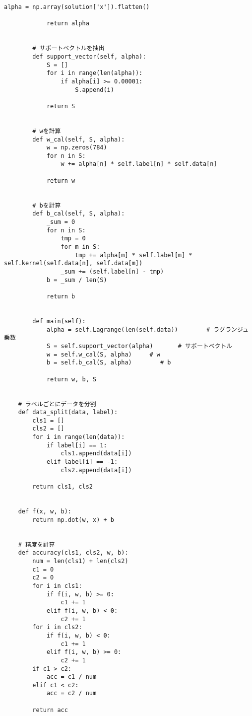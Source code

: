 \begin{lstlisting}[caption=課題2のMNISTの数字画像識別におけるSVM学習用プログラム]
            alpha = np.array(solution['x']).flatten()

            return alpha


        # サポートベクトルを抽出
        def support_vector(self, alpha):
            S = []
            for i in range(len(alpha)):
                if alpha[i] >= 0.00001:
                    S.append(i)
            
            return S


        # wを計算
        def w_cal(self, S, alpha):
            w = np.zeros(784)
            for n in S:
                w += alpha[n] * self.label[n] * self.data[n]
            
            return w

        
        # bを計算
        def b_cal(self, S, alpha):
            _sum = 0
            for n in S:
                tmp = 0
                for m in S:
                    tmp += alpha[m] * self.label[m] * self.kernel(self.data[n], self.data[m])
                _sum += (self.label[n] - tmp)
            b = _sum / len(S)

            return b


        def main(self):
            alpha = self.Lagrange(len(self.data))        # ラグランジュ乗数
            S = self.support_vector(alpha)       # サポートベクトル
            w = self.w_cal(S, alpha)     # w
            b = self.b_cal(S, alpha)        # b

            return w, b, S


    # ラベルごとにデータを分割
    def data_split(data, label):
        cls1 = []
        cls2 = []
        for i in range(len(data)):
            if label[i] == 1:
                cls1.append(data[i])
            elif label[i] == -1:
                cls2.append(data[i])
        
        return cls1, cls2


    def f(x, w, b):
        return np.dot(w, x) + b


    # 精度を計算
    def accuracy(cls1, cls2, w, b):
        num = len(cls1) + len(cls2)
        c1 = 0
        c2 = 0
        for i in cls1:
            if f(i, w, b) >= 0:
                c1 += 1
            elif f(i, w, b) < 0:
                c2 += 1
        for i in cls2:
            if f(i, w, b) < 0:
                c1 += 1
            elif f(i, w, b) >= 0:
                c2 += 1
        if c1 > c2:
            acc = c1 / num
        elif c1 < c2:
            acc = c2 / num

        return acc



\end{lstlisting}

